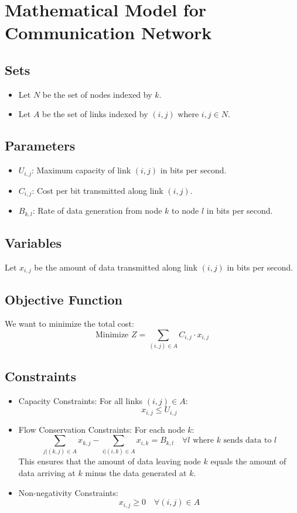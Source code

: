 \documentclass{article}
\begin{document}
\section*{Mathematical Model for Communication Network}

\subsection*{Sets}
\begin{itemize}
    \item Let \( N \) be the set of nodes indexed by \( k \).
    \item Let \( A \) be the set of links indexed by \( (i,j) \) where \( i, j \in N \).
\end{itemize}

\subsection*{Parameters}
\begin{itemize}
    \item \( U_{i,j} \): Maximum capacity of link \( (i,j) \) in bits per second.
    \item \( C_{i,j} \): Cost per bit transmitted along link \( (i,j) \).
    \item \( B_{k,l} \): Rate of data generation from node \( k \) to node \( l \) in bits per second.
\end{itemize}

\subsection*{Variables}
Let \( x_{i,j} \) be the amount of data transmitted along link \( (i,j) \) in bits per second.

\subsection*{Objective Function}
We want to minimize the total cost:
\[
\text{Minimize } Z = \sum_{(i,j) \in A} C_{i,j} \cdot x_{i,j}
\]

\subsection*{Constraints}
\begin{itemize}
    \item Capacity Constraints: For all links \( (i,j) \in A \):
    \[
    x_{i,j} \leq U_{i,j}
    \]
    
    \item Flow Conservation Constraints: For each node \( k \):
    \[
    \sum_{j | (k,j) \in A} x_{k,j} - \sum_{i | (i,k) \in A} x_{i,k} = B_{k,l} \quad \forall l \text{ where } k \text{ sends data to } l
    \]
    This ensures that the amount of data leaving node \( k \) equals the amount of data arriving at \( k \) minus the data generated at \( k \).

    \item Non-negativity Constraints:
    \[
    x_{i,j} \geq 0 \quad \forall (i,j) \in A
    \]
\end{itemize}
\end{document}
